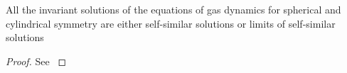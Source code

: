 %
%
\begin{theorem}
All the invariant solutions of the equations of gas dynamics for spherical and cylindrical symmetry are either self-similar solutions or limits of self-similar solutions
%
\label{thm:Invariant Solutions for Gas Dynamics}
\end{theorem}
%
\begin{proof}
See \cite[52]{korobeuinikov1976problems}
%
%
\end{proof}


\endinput %